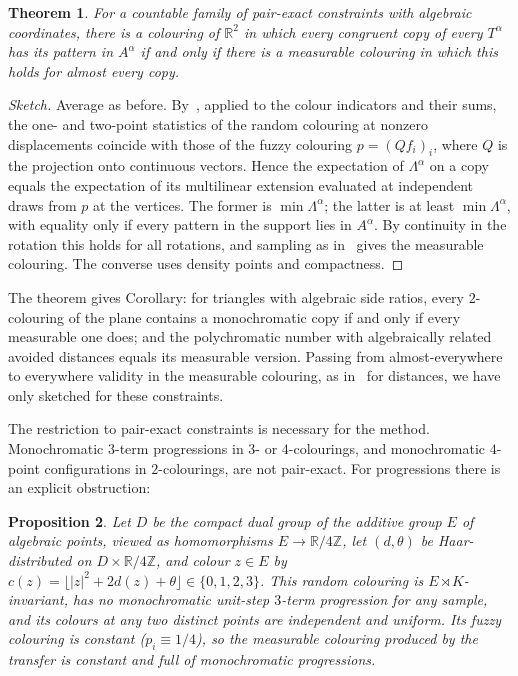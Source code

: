 \documentclass[11pt]{amsart}
\newtheorem{theorem}{Theorem}[section]
\newtheorem{proposition}[theorem]{Proposition}
\theoremstyle{definition}
\newcommand{\R}{\mathbb{R}}
\newcommand{\Z}{\mathbb{Z}}
\begin{document}
\begin{theorem}\label{thm:pairexact}
For a countable family of pair-exact constraints with algebraic coordinates, there is a colouring of $\R^2$ in which every congruent copy of every $T^\alpha$ has its pattern in $A^\alpha$ if and only if there is a measurable colouring in which this holds for almost every copy.
\end{theorem}

\begin{proof}[Sketch]
Average as before. By~\cite[Theorem 2.3]{OAI}, applied to the colour indicators and their sums, the one- and two-point statistics of the random colouring at nonzero displacements coincide with those of the fuzzy colouring $p=(Qf_i)_i$, where $Q$ is the projection onto continuous vectors. Hence the expectation of $\Lambda^\alpha$ on a copy equals the expectation of its multilinear extension evaluated at independent draws from $p$ at the vertices. The former is $\min\Lambda^\alpha$; the latter is at least $\min\Lambda^\alpha$, with equality only if every pattern in the support lies in $A^\alpha$. By continuity in the rotation this holds for all rotations, and sampling as in~\cite[\S4]{OAI} gives the measurable colouring. The converse uses density points and compactness.
\end{proof}

The theorem gives Corollary: for triangles with algebraic side ratios, every $2$-colouring of the plane contains a monochromatic copy if and only if every measurable one does; and the polychromatic number with algebraically related avoided distances equals its measurable version. Passing from almost-everywhere to everywhere validity in the measurable colouring, as in~\cite[Lemma B.1]{Davies} for distances, we have only sketched for these constraints.

The restriction to pair-exact constraints is necessary for the method. Monochromatic $3$-term progressions in $3$- or $4$-colourings, and monochromatic $4$-point configurations in $2$-colourings, are not pair-exact. For progressions there is an explicit obstruction:

\begin{proposition}\label{prop:counter}
Let $D$ be the compact dual group of the additive group $E$ of algebraic points, viewed as homomorphisms $E\to\R/4\Z$, let $(d,\theta)$ be Haar-distributed on $D\times\R/4\Z$, and colour $z\in E$ by $c(z)=\lfloor |z|^2+2d(z)+\theta\rfloor\in\{0,1,2,3\}$. This random colouring is $E\rtimes K$-invariant, has no monochromatic unit-step $3$-term progression for any sample, and its colours at any two distinct points are independent and uniform. Its fuzzy colouring is constant ($p_i\equiv1/4$), so the measurable colouring produced by the transfer is constant and full of monochromatic progressions.
\end{proposition}
\end{document}
